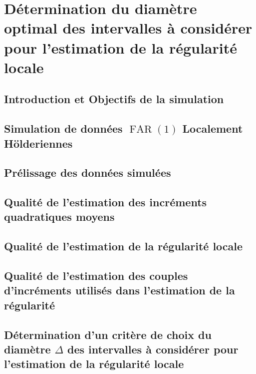 \chapter{Détermination du diamètre optimal des intervalles à considérer pour l'estimation de la régularité locale }
\minitoc%

\section{Introduction et Objectifs de la simulation}



\section{Simulation de données $\operatorname{FAR}(1)$ Localement Hölderiennes}



\section{Prélissage des données simulées}





\section{Qualité de l'estimation des incréments quadratiques moyens}




\section{Qualité de l'estimation de la régularité locale}





\section{Qualité de l'estimation des couples d'incréments utilisés dans l'estimation de la régularité}



\section{Détermination d'un critère de choix du diamètre $\Delta$ des intervalles à considérer pour l'estimation de la régularité locale}

